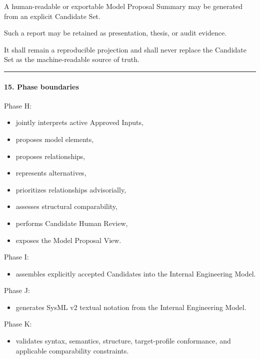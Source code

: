 A human-readable or exportable Model Proposal Summary may be generated from an explicit Candidate Set.

Such a report may be retained as presentation, thesis, or audit evidence.

It shall remain a reproducible projection and shall never replace the Candidate Set as the machine-readable source of truth.

\begin{center}\rule{0.5\linewidth}{0.5pt}\end{center}

\hypertarget{15-phase-boundaries}{%
\paragraph{15. Phase boundaries}\label{15-phase-boundaries}}

Phase H:

\begin{itemize}
\tightlist
\item
  jointly interprets active Approved Inputs,
\item
  proposes model elements,
\item
  proposes relationships,
\item
  represents alternatives,
\item
  prioritizes relationships advisorially,
\item
  assesses structural comparability,
\item
  performs Candidate Human Review,
\item
  exposes the Model Proposal View.
\end{itemize}

Phase I:

\begin{itemize}
\tightlist
\item
  assembles explicitly accepted Candidates into the Internal Engineering Model.
\end{itemize}

Phase J:

\begin{itemize}
\tightlist
\item
  generates SysML v2 textual notation from the Internal Engineering Model.
\end{itemize}

Phase K:

\begin{itemize}
\tightlist
\item
  validates syntax, semantics, structure, target-profile conformance, and applicable comparability constraints.
\end{itemize}

